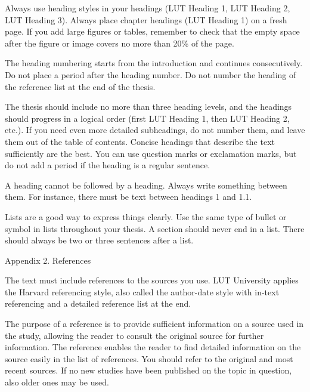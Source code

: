 \documentclass{article}
\begin{document}
\bigskip

Always use heading styles in your headings (LUT Heading 1, LUT Heading 2, LUT Heading 3). Always place chapter headings
(LUT Heading 1) on a fresh page. If you add large figures or tables, remember to check that the empty space after the
figure or image covers no more than 20\% of the page. 


\bigskip

The heading numbering starts from the introduction and continues consecutively. Do not place a period after the heading
number. Do not number the heading of the reference list at the end of the thesis. 


\bigskip

The thesis should include no more than three heading levels, and the headings should progress in a logical order (first
LUT Heading 1, then LUT Heading 2, etc.). If you need even more detailed subheadings, do not number them, and leave
them out of the table of contents. Concise headings that describe the text sufficiently are the best. You can use
question marks or exclamation marks, but do not add a period if the heading is a regular sentence. 


\bigskip

A heading cannot be followed by a heading. Always write something between them. For instance, there must be text between
headings 1 and 1.1. 


\bigskip

Lists are a good way to express things clearly. Use the same type of bullet or symbol in lists throughout your thesis. A
section should never end in a list. There should always be two or three sentences after a list. 

\clearpage

Appendix 2. References 

The text must include references to the sources you use. LUT University applies the Harvard referencing style, also
called the author-date style with in-text referencing and a detailed reference list at the end. 


\bigskip

The purpose of a reference is to provide sufficient information on a source used in the study, allowing the reader to
consult the original source for further information. The reference enables the reader to find detailed information on
the source easily in the list of references. You should refer to the original and most recent sources. If no new
studies have been published on the topic in question, also older ones may be used.
\end{document}
